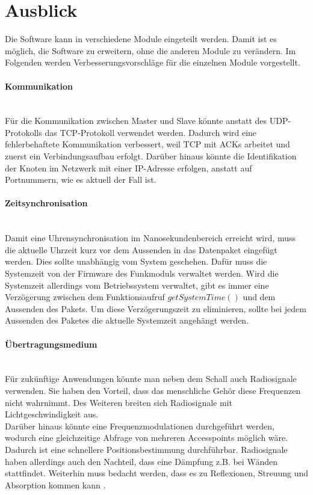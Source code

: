 \newpage

\section{Ausblick}
Die Software kann in verschiedene Module eingeteilt werden. Damit ist es möglich, die Software zu erweitern, ohne die anderen Module zu verändern. Im Folgenden werden Verbesserungsvorschläge für die einzelnen Module vorgestellt.

\paragraph{Kommunikation}\mbox{}\\
Für die Kommunikation zwischen Master und Slave könnte anstatt des UDP-Protokolls das TCP-Protokoll verwendet werden. Dadurch wird eine fehlerbehaftete Kommunikation verbessert, weil TCP mit ACKs arbeitet und zuerst ein Verbindungsaufbau erfolgt. Darüber hinaus könnte die Identifikation der Knoten im Netzwerk mit einer IP-Adresse erfolgen, anstatt auf Portnummern, wie es aktuell der Fall ist.

\paragraph{Zeitsynchronisation}\mbox{}\\
Damit eine Uhrensynchronisation im Nanosekundenbereich erreicht wird, muss die aktuelle Uhrzeit kurz vor dem Aussenden in das Datenpaket eingefügt werden. Dies sollte unabhängig vom System geschehen. Dafür muss die Systemzeit von der Firmware des Funkmoduls verwaltet werden. Wird die Systemzeit allerdings vom Betriebssystem verwaltet, gibt es immer eine Verzögerung zwischen dem Funktionsaufruf $getSystemTime()$ und dem Aussenden des Pakets. Um diese Verzögerungszeit zu eliminieren, sollte bei jedem Aussenden des Paketes die aktuelle Systemzeit angehängt werden.

\paragraph{Übertragungsmedium}\mbox{}\\
Für zukünftige Anwendungen könnte man neben dem Schall auch Radiosignale verwenden. Sie haben den Vorteil, dass das menschliche Gehör diese Frequenzen nicht wahrnimmt. Des Weiteren breiten sich Radiosignale mit Lichtgeschwindigkeit aus.
\\
Darüber hinaus könnte eine Frequenzmodulationen durchgeführt werden, wodurch eine gleichzeitige Abfrage von mehreren Accesspoints möglich wäre. Dadurch ist eine schnellere Positionsbestimmung durchführbar. Radiosignale haben allerdings auch den Nachteil, dass eine Dämpfung z.B. bei Wänden stattfindet. Weiterhin muss bedacht werden, dass es zu Reflexionen, Streuung und Absorption kommen kann \cite{src_RADIOSIGNALE}.

